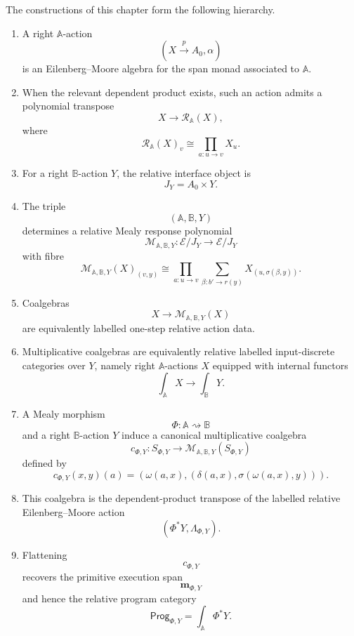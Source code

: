 \begin{theorem}
\label{thm:poly-relative-main-consolidation}
The constructions of this chapter form the following hierarchy.

\begin{enumerate}
\item A right \(\mathbb A\)-action
\[
(X\xrightarrow{p}A_0,\alpha)
\]
is an Eilenberg--Moore algebra for the span monad associated to
\(\mathbb A\).

\item When the relevant dependent product exists, such an action admits a
polynomial transpose
\[
X\to\mathcal R_{\mathbb A}(X),
\]
where
\[
\mathcal R_{\mathbb A}(X)_v
\cong
\prod_{a:u\to v}X_u.
\]

\item For a right \(\mathbb B\)-action \(Y\), the relative interface object is
\[
J_Y=A_0\times Y.
\]

\item The triple
\[
(\mathbb A,\mathbb B,Y)
\]
determines a relative Mealy response polynomial
\[
\mathcal M_{\mathbb A,\mathbb B,Y}:
\mathcal E/J_Y\to\mathcal E/J_Y
\]
with fibre
\[
\mathcal M_{\mathbb A,\mathbb B,Y}(X)_{(v,y)}
\cong
\prod_{a:u\to v}
\sum_{\beta:b'\to r(y)}
X_{(u,\sigma(\beta,y))}.
\]

\item Coalgebras
\[
X\to\mathcal M_{\mathbb A,\mathbb B,Y}(X)
\]
are equivalently labelled one-step relative action data.

\item Multiplicative coalgebras are equivalently relative labelled
input-discrete categories over \(Y\), namely right \(\mathbb A\)-actions \(X\)
equipped with internal functors
\[
\int_{\mathbb A}X\to\int_{\mathbb B}Y.
\]

\item A Mealy morphism
\[
\Phi:\mathbb A\rightsquigarrow\mathbb B
\]
and a right \(\mathbb B\)-action \(Y\) induce a canonical multiplicative
coalgebra
\[
c_{\Phi,Y}:
S_{\Phi,Y}\to
\mathcal M_{\mathbb A,\mathbb B,Y}(S_{\Phi,Y})
\]
defined by
\[
c_{\Phi,Y}(x,y)(a)
=
\left(
\omega(a,x),
\left(
\delta(a,x),
\sigma(\omega(a,x),y)
\right)
\right).
\]

\item This coalgebra is the dependent-product transpose of the labelled
relative Eilenberg--Moore action
\[
(\Phi^\ast Y,\Lambda_{\Phi,Y}).
\]

\item Flattening
\[
c_{\Phi,Y}
\]
recovers the primitive execution span
\[
\mathbf m_{\Phi,Y}
\]
and hence the relative program category
\[
\mathsf{Prog}_{\Phi,Y}
=
\int_{\mathbb A}\Phi^\ast Y.
\]


\end{enumerate}
\end{theorem}
